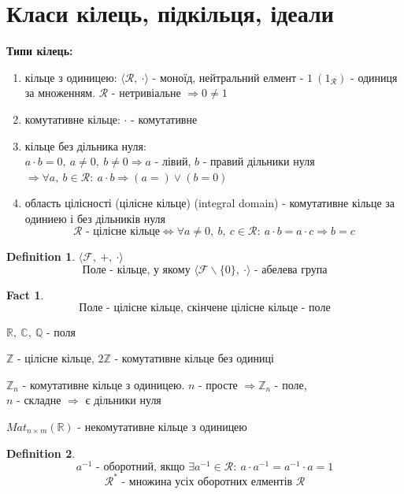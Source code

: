\documentclass[a4paper,12pt, centered]{bookest}
\newtheorem{definition}{Definition}[section]
\newtheorem*{fact*}{Fact}
\begin{document}
\section{Класи кілець, підкільця, ідеали}
\textbf{Типи кілець:}
\begin{enumerate}
	\item кільце з одиницею: $\langle \mathcal{R},\>\cdot \rangle$ - моноїд, нейтральний елмент - $1\>(1_\mathcal{R})$ - одиниця за множенням. $\mathcal{R}$ - нетривіальне $\Rightarrow0\neq1$
	\item комутативне кільце: $\cdot$ - комутативне
	\item кільце без дільника нуля: \\$a\cdot b=0,\>a\neq0,\>b\neq0\Rightarrow a$ - лівий, $b$ - правий дільники нуля\\$\Rightarrow\forall a,\>b\in\mathcal{R}:\>a\cdot b\Rightarrow(a=)\lor(b=0)$ 
	\item область цілісності (цілісне кільце) (integral domain) - комутативне кільце за одиниею і без дільників нуля\\$$\mathcal{R}\textrm{ - цілісне кільце}\Leftrightarrow\forall a\neq0,\>b,\>c\in\mathcal{R}:\>a\cdot b=a\cdot c\Rightarrow b=c$$
\end{enumerate}
\begin{definition}$\langle\mathcal{F},\>+,\>\cdot\rangle$
	$$\textrm{Поле - кільце, у якому }\langle\mathcal{F}\backslash\{0\},\>\cdot\rangle\textrm{ - абелева група}$$
\end{definition}
\begin{fact*}
	$$\textrm{Поле - цілісне кільце, скінчене цілісне кільце - поле}$$
\end{fact*}
\begin{example}
	$\mathbb{R},\>\mathbb{C},\>\mathbb{Q}$ - поля
\end{example}
\begin{example}
	$\mathbb{Z}$ - цілісне кільце, $2\mathbb{Z}$ - комутативне кільце без одиниці 
\end{example}
\begin{example}
	$\mathbb{Z}_n$ - комутативне кільце з одиницею. $n$ - просте $\Rightarrow\mathbb{Z}_n$ - поле, \\$n$ - складне $\Rightarrow$ є дільники нуля
\end{example}
\begin{example}
	$Mat_{n\times m}(\mathbb{R})$ - некомутативне кільце з одиницею
\end{example}
\begin{definition}
	$$a^{-1}\textrm{ - оборотний, якщо }\exists a^{-1}\in\mathcal{R}:\>a\cdot a^{-1}=a^{-1}\cdot a=1$$
	$$\mathcal{R}^*\textrm{ - множина усіх оборотних елментів }\mathcal{R}$$
\end{definition}
\end{document}

